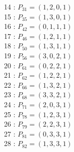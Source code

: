 \documentclass{article}
\begin{document}
{\begin{multicols}{3}
14 : $P_{31}=( 1, 2, 0, 1 )$\\
15 : $P_{35}=( 1, 3, 0, 1 )$\\
16 : $P_{42}=( 0, 1, 1, 1 )$\\
17 : $P_{46}=( 1, 2, 1, 1 )$\\
18 : $P_{50}=( 1, 3, 1, 1 )$\\
19 : $P_{56}=( 3, 0, 2, 1 )$\\
20 : $P_{61}=( 0, 2, 2, 1 )$\\
21 : $P_{62}=( 1, 2, 2, 1 )$\\
22 : $P_{66}=( 1, 3, 2, 1 )$\\
23 : $P_{68}=( 3, 3, 2, 1 )$\\
24 : $P_{71}=( 2, 0, 3, 1 )$\\
25 : $P_{78}=( 1, 2, 3, 1 )$\\
26 : $P_{79}=( 2, 2, 3, 1 )$\\
27 : $P_{81}=( 0, 3, 3, 1 )$\\
28 : $P_{82}=( 1, 3, 3, 1 )$\\
\end{multicols}


%


%


}%
\end{document}

